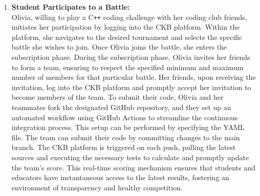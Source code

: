 \begin{enumerate}

    \item \textbf{Student Participates to a Battle:} \\
    Olivia, willing to play a C\texttt{++} coding challenge with her coding club friends, initiates her participation by logging into the CKB platform. Within the platform, she navigates to the desired tournament and selects the specific battle she wishes to join. Once Olivia joins the battle, she enters the subscription phase.
During the subscription phase, Olivia invites her friends to form a team, ensuring to respect the specified minimum and maximum number of members for that particular battle. Her friends, upon receiving the invitation, log into the CKB platform and promptly accept her invitation to become members of the team.
To submit their code, Olivia and her teammates fork the designated GitHub repository, and they set up an automated workflow using GitHub Actions to streamline the continuous integration process. This setup can be performed by specifying the YAML file. The team can submit their code by committing changes to the main branch.
The CKB platform is triggered on each push, pulling the latest sources and executing the necessary tests to calculate and promptly update the team's score. This real-time scoring mechanism ensures that students and educators have instantaneous access to the latest results, fostering an environment of transparency and healthy competition.
    

\end{enumerate}
